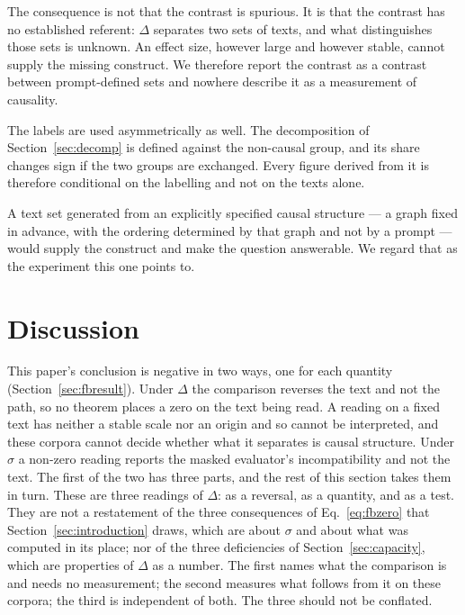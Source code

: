 \documentclass[11pt]{article}
\begin{document}
The consequence is not that the contrast is spurious.  It is that the contrast
has no established referent: $\Delta$ separates two sets of texts, and what
distinguishes those sets is unknown.  An effect size, however large and however
stable, cannot supply the missing construct.  We therefore report the contrast
as a contrast between prompt-defined sets and nowhere describe it as a
measurement of causality.

The labels are used asymmetrically as well.  The decomposition of
Section~\ref{sec:decomp} is defined against the non-causal group, and its
share changes sign if the two groups are exchanged.  Every figure derived
from it is therefore conditional on the labelling and not on the texts
alone.

A text set generated from an explicitly specified causal structure --- a graph
fixed in advance, with the ordering determined by that graph and not by a
prompt --- would supply the construct and make the question answerable.  We
regard that as the experiment this one points to.





\section{Discussion}

This paper's conclusion is negative in two ways, one for each quantity
(Section~\ref{sec:fbresult}).  Under $\Delta$ the comparison reverses the
text and not the path, so no theorem places a zero on the text being read.
A reading on a fixed text has neither a stable scale nor an origin and so
cannot be interpreted, and these corpora cannot decide whether what it
separates is causal structure.  Under $\sigma$ a
non-zero reading reports the masked evaluator's incompatibility and not
the text.  The first of the two has three parts, and the rest of
this section takes them in turn.  These are three readings of $\Delta$: as a
reversal, as a quantity, and as a test.  They are not a restatement of the
three consequences of
Eq.~\eqref{eq:fbzero} that Section~\ref{sec:introduction} draws, which are
about $\sigma$ and about what was computed in its place; nor of the three
deficiencies of Section~\ref{sec:capacity}, which are properties of
$\Delta$ as a number.  The first names what the comparison is and needs no
measurement; the second measures what follows from it on these corpora; the
third is independent of both.  The three should not be conflated.
\end{document}
